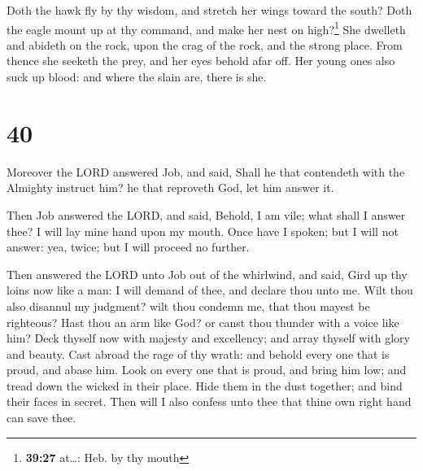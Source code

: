  Doth the hawk fly by thy wisdom, and stretch her wings
toward the south?  Doth the eagle mount up at thy
command, and make her nest on high?\footnote{\textbf{39:27} at\ldots:
  Heb. by thy mouth}  She dwelleth and abideth on the
rock, upon the crag of the rock, and the strong place. 
From thence she seeketh the prey, and her eyes behold afar off.
 Her young ones also suck up blood: and where the slain
are, there is she.

\hypertarget{section-39}{%
\section{40}\label{section-39}}

 Moreover the LORD answered Job, and said, 
Shall he that contendeth with the Almighty instruct him? he that
reproveth God, let him answer it.

 Then Job answered the LORD, and said, 
Behold, I am vile; what shall I answer thee? I will lay mine hand upon
my mouth.  Once have I spoken; but I will not answer: yea,
twice; but I will proceed no further.

 Then answered the LORD unto Job out of the whirlwind, and
said,  Gird up thy loins now like a man: I will demand of
thee, and declare thou unto me.  Wilt thou also disannul
my judgment? wilt thou condemn me, that thou mayest be righteous?
 Hast thou an arm like God? or canst thou thunder with a
voice like him?  Deck thyself now with majesty and
excellency; and array thyself with glory and beauty. 
Cast abroad the rage of thy wrath: and behold every one that is proud,
and abase him.  Look on every one that is proud, and
bring him low; and tread down the wicked in their place. 
Hide them in the dust together; and bind their faces in secret.
 Then will I also confess unto thee that thine own right
hand can save thee.

